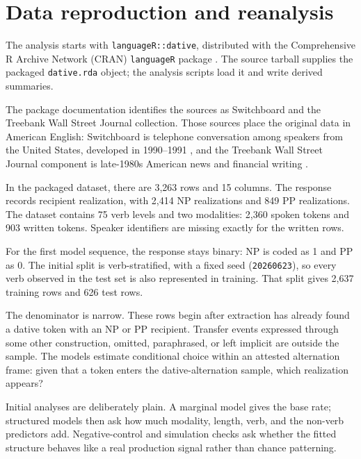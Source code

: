 \section{Data reproduction and reanalysis}

The analysis starts with \texttt{languageR::dative}, distributed with the
Comprehensive R Archive Network (CRAN) \texttt{languageR} package
\citep{BaayenShafaeiBajestan2025languageR}. The source tarball supplies the
packaged \texttt{dative.rda} object; the analysis scripts load it and write
derived summaries.

The package documentation identifies the sources as Switchboard and the
Treebank Wall Street Journal collection. Those sources place the original data
in American English: Switchboard is telephone conversation among speakers from
the United States, developed in 1990--1991
\citep{GodfreyHolliman1993Switchboard1}, and the Treebank Wall Street Journal
component is late-1980s American news and financial writing
\citep{MarcusSantoriniMarcinkiewiczTaylor1999Treebank3,CharniakEtAl2000BLLIPWSJ}.

In the packaged dataset, there are 3,263 rows and 15 columns. The response
records recipient realization, with 2,414 NP realizations and 849 PP
realizations. The dataset contains 75 verb levels and two modalities: 2,360
spoken tokens and 903 written tokens. Speaker identifiers are missing exactly
for the written rows.

For the first model sequence, the response stays binary: NP is coded as 1 and PP as
0. The initial split is verb-stratified, with a fixed seed
(\texttt{20260623}), so every verb observed in the test set is also represented
in training. That split gives 2,637 training rows and 626 test rows.

The denominator is narrow. These rows begin after extraction has already found a
dative token with an NP or PP recipient. Transfer events expressed through some
other construction, omitted, paraphrased, or left implicit are outside the
sample. The models estimate conditional choice within an attested alternation
frame: given that a token enters the dative-alternation sample, which realization
appears?

Initial analyses are deliberately plain. A marginal model gives the base rate;
structured models then ask how much modality, length, verb, and the non-verb
predictors add. Negative-control and simulation checks ask whether the fitted
structure behaves like a real production signal rather than chance patterning.

